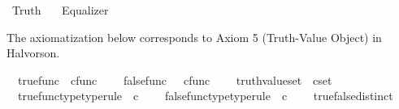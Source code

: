 %
\begin{isabellebody}%
%
%
\isadelimdocument
%
\endisadelimdocument
%
\isatagdocument
%
\isamarkuptrue%
%
\endisatagdocument
{\isafolddocument}%
%
\isadelimdocument
%
\endisadelimdocument
%
\isadelimtheory
%
\endisadelimtheory
%
\isatagtheory
{}\isamarkupfalse%
\ Truth\isanewline
\ \ \ Equalizer\isanewline
{}%
\endisatagtheory
{\isafoldtheory}%
%
\isadelimtheory
%
\endisadelimtheory
%
\begin{isamarkuptext}%
The axiomatization below corresponds to Axiom 5 (Truth-Value Object) in Halvorson.%
\end{isamarkuptext}\isamarkuptrue%
\isamarkupfalse%
\isanewline
\ \ true{\isacharunderscore}{\kern0pt}func\ {\isacharcolon}{\kern0pt}{\isacharcolon}{\kern0pt}\ {\isachardoublequoteopen}cfunc{\isachardoublequoteclose}\ {\isacharparenleft}{\kern0pt}{\isachardoublequoteopen}{\isasymt}{\isachardoublequoteclose}{\isacharparenright}{\kern0pt}\ \isanewline
\ \ false{\isacharunderscore}{\kern0pt}func\ \ {\isacharcolon}{\kern0pt}{\isacharcolon}{\kern0pt}\ {\isachardoublequoteopen}cfunc{\isachardoublequoteclose}\ {\isacharparenleft}{\kern0pt}{\isachardoublequoteopen}{\isasymf}{\isachardoublequoteclose}{\isacharparenright}{\kern0pt}\ \isanewline
\ \ truth{\isacharunderscore}{\kern0pt}value{\isacharunderscore}{\kern0pt}set\ {\isacharcolon}{\kern0pt}{\isacharcolon}{\kern0pt}\ {\isachardoublequoteopen}cset{\isachardoublequoteclose}\ {\isacharparenleft}{\kern0pt}{\isachardoublequoteopen}{\isasymOmega}{\isachardoublequoteclose}{\isacharparenright}{\kern0pt}\isanewline
{}\isanewline
\ \ true{\isacharunderscore}{\kern0pt}func{\isacharunderscore}{\kern0pt}type{\isacharbrackleft}{\kern0pt}type{\isacharunderscore}{\kern0pt}rule{\isacharbrackright}{\kern0pt}{\isacharcolon}{\kern0pt}\ {\isachardoublequoteopen}{\isasymt}\ {\isasymin}\isactrlsub c\ {\isasymOmega}{\isachardoublequoteclose}\ \isanewline
\ \ false{\isacharunderscore}{\kern0pt}func{\isacharunderscore}{\kern0pt}type{\isacharbrackleft}{\kern0pt}type{\isacharunderscore}{\kern0pt}rule{\isacharbrackright}{\kern0pt}{\isacharcolon}{\kern0pt}\ {\isachardoublequoteopen}{\isasymf}\ {\isasymin}\isactrlsub c\ {\isasymOmega}{\isachardoublequoteclose}\ \isanewline
\ \ true{\isacharunderscore}{\kern0pt}false{\isacharunderscore}{\kern0pt}distinct{\isacharcolon}{\kern0pt}\ {\isachardoublequoteopen}{\isasymt}\ {\isasymnoteq}\ {\isasymf}{\isachardoublequoteclose}\ \isanewline

\end{isabellebody}
